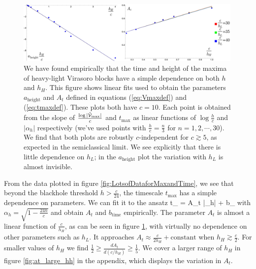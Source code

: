 \begin{figure}[h]
\begin{centering}
\includegraphics[width=0.99\textwidth]{virasoro_chapter/aparameterfits}
\caption[Size and location of peaks in Virasoro blocks as functions of $h_L$]{ We have found empirically that the time and height of the maxima of heavy-light Virasoro blocks have a simple dependence on both $h$ and $h_H$.  This figure shows linear fits used to obtain the parameters $a_{\text{height}}$ and $A_t$ defined in equations (\ref{eq:Vmaxdef}) and (\ref{eq:tmaxdef}).  These plots both have $c=10$. Each point is obtained from the slope of $\frac{\log|\tilde{{\cal V}}_\text{max}|}{c}$ and $t_{\max}$ as linear functions of $\log \frac{h}{c}$ and $|\alpha_h|$ respectively (we've used points with $\frac{h}{c} = \frac{n}{3}$ for $n = 1, 2, \cdots, 30$).  We find that both plots are robustly $c$-independent for $c \gtrsim 5$, as expected in the semiclassical limit.  We see explicitly that there is little dependence on $h_L$; in the $a_{\text{height}}$ plot the variation with $h_L$ is almost invisible. }
\label{fig:aparameterfits}
\end{centering}
\end{figure}


From the data plotted in figure \ref{fig:LotsofDataforMaxandTime}, we see that beyond the blackhole threshold $h > \frac{c}{24}$, the timescale $t_{\text{max}}$ has a simple dependence on parameters.  We can fit it to the ansatz 
\be \label{eq:tmaxdef}
t_{} = A_t  |\alpha_h| + b_{}
\ee
with $\alpha_h=\sqrt{1-\frac{24h}{c}}$ and obtain $A_t$ and $b_{\text{time}}$ empirically.  The parameter $A_t$ is almost a linear function of $\frac{c}{h_H}$, as can be seen in figure \ref{fig:aparameterfits}, with virtually no dependence on other parameters such as $h_L$. It approaches $A_t \approx \frac{c}{2h_H}+\text{constant}$ when $h_H \gtrsim \frac{c}{2}$.  For smaller values of $h_H$ we find  $\frac{1}{2} \geq \frac{d A_t}{d(c/h_H)} \geq \frac{1}{5}$.    We cover a larger range of $h_H$ in figure \ref{fig:at_large_hh} in the appendix, which displays the variation in $A_t$.

